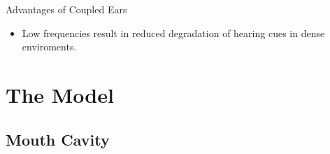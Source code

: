 \documentclass{beamer}
\begin{document}
\begin{frame}[t]
 \begin{exampleblock}{Advantages of Coupled Ears}
 \begin{itemize}
  \item Low frequencies result in reduced degradation of hearing cues in dense enviroments.
 \end{itemize}

  
 \end{exampleblock}

\end{frame}

\section{The Model}

\subsection{Mouth Cavity}
\end{document}
